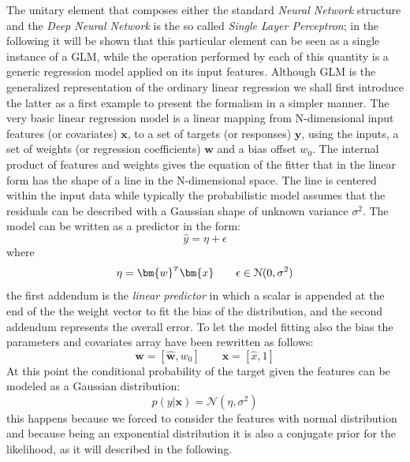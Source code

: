 The unitary element that composes either the standard \textit{Neural Network} structure and the \textit{Deep Neural Network} is the so called \textit{Single Layer Perceptron}; in the following it will be shown that this particular element can be seen as a single instance of a \ac{GLM}, while the operation performed by each of this quantity is a generic regression model applied on its input features.
%
Although GLM is the generalized representation of the ordinary linear regression we shall first introduce the latter as a first example to present the formalism in a simpler manner.
The very basic linear regression model is a linear mapping from N-dimensional input features (or covariates) $\bm{x}$, to a set of targets (or responses) $\bm{y}$, using the inputs, a set of weights (or regression coefficients) $\bm{w}$ and a bias offset $w_0$. The internal product of features and weights gives the equation of the fitter that in the linear form has the shape of a line in the N-dimensional space. The line is centered within the input data while typically the probabilistic model assumes that the residuals can be described with a Gaussian shape of unknown variance $\sigma^2$. The model can be written as a predictor in the form:
\begin{equation}
    \hat{y} = \eta + \epsilon
\end{equation}
where
\begin{equation}
     \eta = \transpose{\bm{w}}\bm{x} \qquad  \epsilon \in \mathcal{N}(0,\sigma^2)
\end{equation}
the first addendum is the \textit{linear predictor} in which a scalar is appended at the end of the the weight vector to fit the bias of the distribution, and the second addendum represents the overall error. To let the model fitting also the bias the parameters and covariates array have been rewritten as follows:
\begin{equation}
    \bm{w} = [\hat{\bm{w}},w_0] \qquad \bm{x} = [\hat{x}, 1]
\end{equation}
At this point the conditional probability of the target given the features can be modeled as a Gaussian distribution:
\begin{equation}
    p(y|\bm{x}) = \mathcal{N}(\eta, \sigma^2)
\end{equation}
this happens because we forced to consider the features with normal distribution and because being an exponential distribution it is also a conjugate prior for the likelihood, as it will described in the following.



